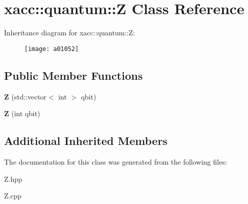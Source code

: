 \hypertarget{a01052}{}\section{xacc\+:\+:quantum\+:\+:Z Class Reference}
\label{a01052}
Inheritance diagram for xacc\+:\+:quantum\+:\+:Z\+:\begin{figure}[H]
\begin{center}
\leavevmode
\texttt{[image: a01052]}
\end{center}
\end{figure}
\subsection*{Public Member Functions}
\begin{DoxyCompactItemize}
\item 
\mbox{\label{a01052_a5f1d311b357faed8c2665fe20cf24aeb}} 
{\bfseries Z} (std\+::vector$<$ int $>$ qbit)
\item 
\mbox{\label{a01052_aa1bb7e533e7595e9ecd06879a2f8d2de}} 
{\bfseries Z} (int qbit)
\end{DoxyCompactItemize}
\subsection*{Additional Inherited Members}


The documentation for this class was generated from the following files\+:\begin{DoxyCompactItemize}
\item 
Z.\+hpp\item 
Z.\+cpp\end{DoxyCompactItemize}
